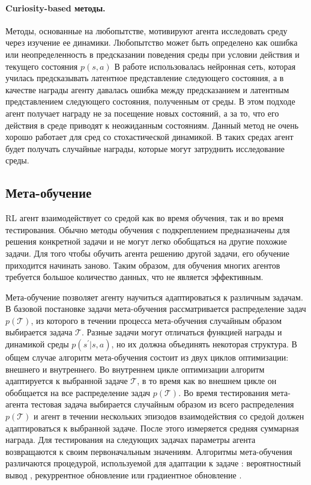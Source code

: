 \paragraph{Curiosity-based методы.} Методы, основанные на любопытстве, мотивируют агента исследовать среду через изучение ее динамики. Любопытство может быть определено как ошибка или неопределенность в предсказании поведения среды при условии действия и текущего состояния $p(s, a)$ \cite{stadie2015incentivizing, pathak2017curiosity} В работе \cite{pathak2017curiosity} использовалась нейронная сеть, которая училась предсказывать латентное представление следующего состояния, а в качестве награды агенту давалась ошибка между предсказанием и латентным представлением следующего состояния, полученным от среды. В этом подходе агент получает награду не за посещение новых состояний, а за то, что его действия в среде приводят к неожиданным состояниям. Данный метод не очень хорошо работает для сред со стохастической динамикой. В таких средах агент будет получать случайные награды, которые могут затруднить исследование среды. 


\subsection{Мета-обучение}\label{sec:ch1/sec1/subsec8}

RL агент взаимодействует со средой как во время обучения, так и во время тестирования. Обычно методы обучения с подкреплением предназначены для решения конкретной задачи и не могут легко обобщаться на другие похожие задачи. Для того чтобы обучить агента решению другой задачи, его обучение приходится начинать заново. Таким образом, для обучения многих агентов требуется большое количество данных, что не является эффективным.

Мета-обучение позволяет агенту научиться адаптироваться к различным задачам. В базовой постановке задачи мета-обучения рассматривается распределение задач $p(\mathcal{T})$, из которого в течении процесса мета-обучения случайным образом выбирается задача $\mathcal{T}$. Разные задачи могут отличаться функцией награды и динамикой среды $p(s^{\prime}|s, a)$, но их должна объединять некоторая структура.
В общем случае алгоритм мета-обучения состоит из двух циклов оптимизации: внешнего и внутреннего. 
Во внутреннем цикле оптимизации алгоритм адаптируется к выбранной задаче $\mathcal{T}$, в то время как во внешнем цикле он обобщается на все распределение задач $p(\mathcal{T})$. Во время тестирования мета-агента тестовая задача выбирается случайным образом из всего распределения $p(\mathcal{T})$ и агент в течении нескольких эпизодов взаимодействия со средой должен адаптироваться к выбранной задаче. После этого измеряется средняя суммарная награда. Для тестирования на следующих задачах параметры агента возвращаются к своим первоначальным значениям. Алгоритмы мета-обучения различаются процедурой, используемой для адаптации к задаче \cite{meld}: вероятностный вывод  \cite{PEARL, VariBad},  рекуррентное обновление \cite{meld, RL2} или градиентное обновление \cite{maml}. 


